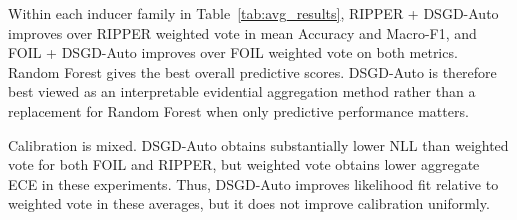 \documentclass[conference]{IEEEtran}
\renewcommand{\arraystretch}{0.95}
\begin{document}
Within each inducer family in Table~\ref{tab:avg_results}, RIPPER + DSGD-Auto improves over RIPPER weighted vote in mean Accuracy and Macro-F1, and FOIL + DSGD-Auto improves over FOIL weighted vote on both metrics. Random Forest gives the best overall predictive scores. DSGD-Auto is therefore best viewed as an interpretable evidential aggregation method rather than a replacement for Random Forest when only predictive performance matters.

Calibration is mixed. DSGD-Auto obtains substantially lower NLL than weighted vote for both FOIL and RIPPER, but weighted vote obtains lower aggregate ECE in these experiments. Thus, DSGD-Auto improves likelihood fit relative to weighted vote in these averages, but it does not improve calibration uniformly.

\begin{table}[!t]
  \caption{Average rule and aggregated-explanation lengths.}
  \label{tab:rule_lengths}
  \centering
  \footnotesize
  \setlength{\tabcolsep}{2.6pt}
  \renewcommand{\arraystretch}{1.00}
\end{table}
\end{document}
